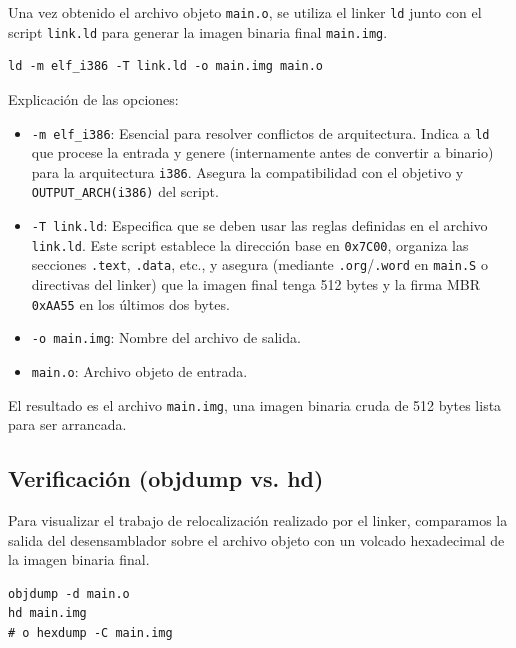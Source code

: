 Una vez obtenido el archivo objeto \texttt{main.o}, se utiliza el linker \texttt{ld} junto con el script \texttt{link.ld} para generar la imagen binaria final \texttt{main.img}.

\begin{lstlisting}[style=BashInputStyle, caption=Comando de enlace]
ld -m elf_i386 -T link.ld -o main.img main.o
\end{lstlisting}

Explicación de las opciones:
\begin{itemize}[noitemsep]
    \item \texttt{-m elf\_i386}: Esencial para resolver conflictos de arquitectura. Indica a \texttt{ld} que procese la entrada y genere (internamente antes de convertir a binario) para la arquitectura \texttt{i386}. Asegura la compatibilidad con el objetivo y \texttt{OUTPUT\_ARCH(i386)} del script.
    \item \texttt{-T link.ld}: Especifica que se deben usar las reglas definidas en el archivo \texttt{link.ld}. Este script establece la dirección base en \texttt{0x7C00}, organiza las secciones \texttt{.text}, \texttt{.data}, etc., y asegura (mediante \texttt{.org}/\texttt{.word} en \texttt{main.S} o directivas del linker) que la imagen final tenga 512 bytes y la firma MBR \texttt{0xAA55} en los últimos dos bytes.
    \item \texttt{-o main.img}: Nombre del archivo de salida.
    \item \texttt{main.o}: Archivo objeto de entrada.
\end{itemize}
El resultado es el archivo \texttt{main.img}, una imagen binaria cruda de 512 bytes lista para ser arrancada.

\subsection{Verificación (objdump vs. hd)}

Para visualizar el trabajo de relocalización realizado por el linker, comparamos la salida del desensamblador sobre el archivo objeto con un volcado hexadecimal de la imagen binaria final.

\begin{lstlisting}[style=BashInputStyle, caption=Comandos de verificación]
objdump -d main.o
hd main.img 
# o hexdump -C main.img
\end{lstlisting}

